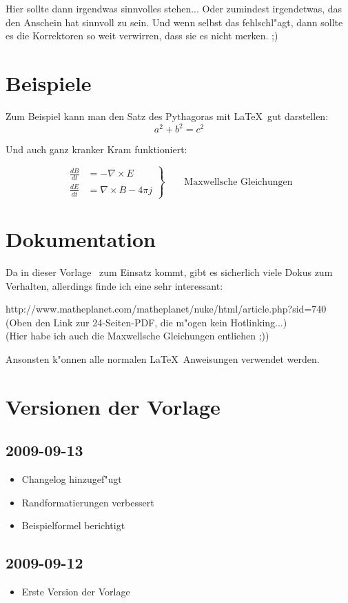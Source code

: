 \documentclass[10pt,a4paper]{article}
\begin{document}
\setlength{\parindent}{0mm}
\setlength{\parskip}{6pt }


Hier sollte dann irgendwas sinnvolles stehen... Oder zumindest irgendetwas, das den Anschein hat sinnvoll zu sein. 
Und wenn selbst das fehlschl"agt, dann sollte es die Korrektoren so weit verwirren, dass sie es nicht merken. ;)

\section{Beispiele}

Zum Beispiel kann man den Satz des Pythagoras mit \LaTeX\ gut darstellen:
\begin{equation}
	a^2 + b^2 = c^2
\end{equation}

Und auch ganz kranker Kram funktioniert:

\begin{equation} \left. \begin{aligned} \frac{dB}{dt} & = -\nabla \times E \\ \frac{dE}{dt} & = \nabla \times B - 4 \pi j \end{aligned} \right\}\qquad \text{Maxwellsche Gleichungen} \end{equation}

\section{Dokumentation}

Da in dieser Vorlage \AmS\ zum Einsatz kommt, gibt es sicherlich viele Dokus zum Verhalten, allerdings finde ich eine sehr interessant:

http://www.matheplanet.com/matheplanet/nuke/html/article.php?sid=740 (Oben den Link zur 24-Seiten-PDF, die m"ogen kein Hotlinking...)\\\small{(Hier habe ich auch die Maxwellsche Gleichungen entliehen ;))}

Ansonsten k"onnen alle normalen \LaTeX\ Anweisungen verwendet werden.

\section{Versionen der Vorlage}
\subsection{2009-09-13}
\begin{itemize}
\item{Changelog hinzugef"ugt}
\item{Randformatierungen verbessert}
\item{Beispielformel berichtigt}
\end{itemize}
\subsection{2009-09-12}
\begin{itemize}
\item{Erste Version der Vorlage}
\end{itemize}

\end{document}
